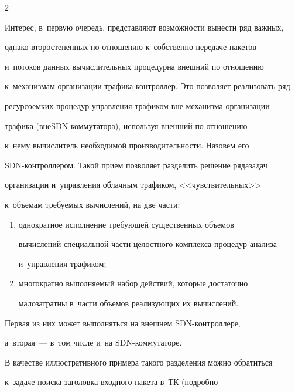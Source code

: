 \begin{multicols}{2}
  


  Интерес, в~первую очередь, представляют возможности вынести ряд важных, 


однако второстепенных по отношению к~собственно передаче пакетов 


и~потоков данных вычислительных процедур\linebreak на внешний по отношению 


к~механизмам организации трафика контроллер. Это позволяет реализовать ряд 


ресурсоемких процедур управления трафиком вне механизма организации 


трафика (вне\linebreak SDN-ком\-му\-та\-то\-ра), используя внешний по отношению 


к~нему вычислитель необходимой про\-из\-во\-ди\-тель\-ности. Назовем его  


SDN-конт\-рол\-ле\-ром. Такой прием позволяет разделить решение ряда\linebreak задач 


организации и~управ\-ле\-ния облачным трафиком, <<чувствительных>> 


к~объемам требуемых вы\-чис\-ле\-ний, на две части:


  \begin{enumerate}[(1)]


\item однократное исполнение требующей существенных объемов 


вычислений специальной части целостного комплекса процедур анализа 


и~управления трафиком;


\item многократно выполняемый набор действий, которые достаточно 


малозатратны в~части объемов реализующих их вычислений.


\end{enumerate}





  Первая из них может выполняться на внешнем SDN-конт\-рол\-ле\-ре, 


а~вторая~--- в~том числе и~на SDN-ком\-му\-та\-торе.


  


  В качестве иллюстративного примера такого разделения можно обратиться 


к~задаче поиска заголовка входного пакета в~ТК (по\-дроб\-но 



\end{multicols}
